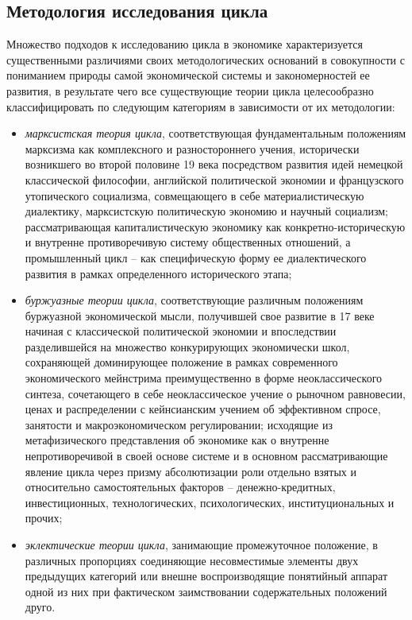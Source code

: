 \subsection{Методология исследования цикла}
Множество подходов к исследованию цикла в экономике характеризуется существенными различиями своих методологических оснований в совокупности с пониманием природы самой экономической системы и закономерностей ее развития, в результате чего все существующие теории цикла целесообразно классифицировать по следующим категориям в зависимости от их методологии:
\begin{itemize}
    \item \textit{марксистская теория цикла}, соответствующая фундаментальным положениям марксизма как комплексного и разностороннего учения, исторически возникшего во второй половине 19 века посредством развития идей немецкой классической философии, английской политической экономии и французского утопического социализма, совмещающего в себе материалистическую диалектику, марксистскую политическую экономию и научный социализм; рассматривающая капиталистическую экономику как конкретно-историческую и внутренне противоречивую систему общественных отношений, а промышленный цикл – как специфическую форму ее диалектического развития в рамках определенного исторического этапа;
    \item \textit{буржуазные теории цикла}, соответствующие различным положениям буржуазной экономической мысли, получившей свое развитие в 17 веке начиная с классической политической экономии и впоследствии разделившейся на множество конкурирующих экономически школ, сохраняющей доминирующее положение в рамках современного экономического мейнстрима преимущественно в форме неоклассического синтеза, сочетающего в себе неоклассическое учение о рыночном равновесии, ценах и распределении с кейнсианским учением об эффективном спросе, занятости и макроэкономическом регулировании; исходящие из метафизического представления об экономике как о внутренне непротиворечивой в своей основе системе и в основном рассматривающие явление цикла через призму абсолютизации роли отдельно взятых и относительно самостоятельных факторов – денежно-кредитных, инвестиционных, технологических, психологических, институциональных и прочих;
    \item \textit{эклектические теории цикла}, занимающие промежуточное положение, в различных пропорциях соединяющие несовместимые элементы двух предыдущих категорий или внешне воспроизводящие понятийный аппарат одной из них при фактическом заимствовании содержательных положений друго.
\end{itemize}


